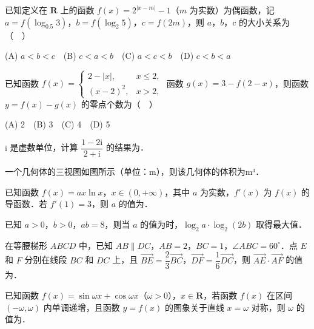 \begin{question}
已知定义在 \(\mathbf{R}\) 上的函数 \(f(x)=2^{|x-m|}-1\)（\(m\) 为实数）为偶函数，记 \(a=f(\log_{0.5}3)\)，\(b=f(\log_2 5)\)，\(c=f(2m)\)，则 \(a\)，\(b\)，\(c\) 的大小关系为（　）

(A) \(a<b<c\)　(B) \(c<a<b\)　(C) \(a<c<b\)　(D) \(c<b<a\)

\end{question}
\begin{question}
已知函数 $f(x)=\begin{cases}2-|x|,&x\leqslant2,\\(x-2)^2,&x>2,\end{cases}$ 函数 \(g(x)=3-f(2-x)\)，则函数 \(y=f(x)-g(x)\) 的零点个数为（　）

(A) 2　(B) 3　(C) 4　(D) 5

\end{question}

\begin{question}
\(\mathrm{i}\) 是虚数单位，计算 \(\dfrac{1-2\mathrm{i}}{2+\mathrm{i}}\) 的结果为\gkblank{}．

\Needspace{0.4\textheight}
\end{question}
\begin{question}
一个几何体的三视图如图所示（单位：m），则该几何体的体积为\gkblank{}m³．
\nopagebreak[4]
\begin{center}\end{center}
\nopagebreak[4]
\end{question}
\begin{question}
已知函数 \(f(x)=ax\ln x\)，\(x\in(0,+\infty)\)，其中 \(a\) 为实数，\(f'(x)\) 为 \(f(x)\) 的导函数．若 \(f'(1)=3\)，则 \(a\) 的值为\gkblank{}．

\end{question}
\begin{question}
已知 \(a>0\)，\(b>0\)，\(ab=8\)，则当 \(a\) 的值为\gkblank{}时，\(\log_2 a\cdot\log_2(2b)\) 取得最大值．

\end{question}
\begin{question}
在等腰梯形 \(ABCD\) 中，已知 \(AB\parallel DC\)，\(AB=2\)，\(BC=1\)，\(\angle ABC=60^{\circ}\)．点 \(E\) 和 \(F\) 分别在线段 \(BC\) 和 \(DC\) 上，且 \(\overrightarrow{BE}=\dfrac{2}{3}\overrightarrow{BC}\)，\(\overrightarrow{DF}=\dfrac{1}{6}\overrightarrow{DC}\)，则 \(\overrightarrow{AE}\cdot\overrightarrow{AF}\) 的值为\gkblank{}．

\end{question}
\begin{question}
已知函数 \(f(x)=\sin\omega x+\cos\omega x\)（\(\omega>0\)），\(x\in\mathbf{R}\)，若函数 \(f(x)\) 在区间 \((-\omega,\omega)\) 内单调递增，且函数 \(y=f(x)\) 的图象关于直线 \(x=\omega\) 对称，则 \(\omega\) 的值为\gkblank{}．

\end{question}

